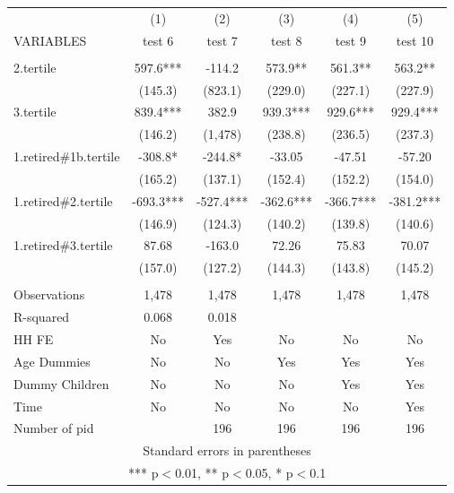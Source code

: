 \begin{tabular}{lccccc} \hline
 & (1) & (2) & (3) & (4) & (5) \\
VARIABLES & test 6 & test 7 & test 8 & test 9 & test 10 \\ \hline
 &  &  &  &  &  \\
2.tertile & 597.6*** & -114.2 & 573.9** & 561.3** & 563.2** \\
 & (145.3) & (823.1) & (229.0) & (227.1) & (227.9) \\
3.tertile & 839.4*** & 382.9 & 939.3*** & 929.6*** & 929.4*** \\
 & (146.2) & (1,478) & (238.8) & (236.5) & (237.3) \\
1.retired\#1b.tertile & -308.8* & -244.8* & -33.05 & -47.51 & -57.20 \\
 & (165.2) & (137.1) & (152.4) & (152.2) & (154.0) \\
1.retired\#2.tertile & -693.3*** & -527.4*** & -362.6*** & -366.7*** & -381.2*** \\
 & (146.9) & (124.3) & (140.2) & (139.8) & (140.6) \\
1.retired\#3.tertile & 87.68 & -163.0 & 72.26 & 75.83 & 70.07 \\
 & (157.0) & (127.2) & (144.3) & (143.8) & (145.2) \\
 &  &  &  &  &  \\
Observations & 1,478 & 1,478 & 1,478 & 1,478 & 1,478 \\
R-squared & 0.068 & 0.018 &  &  &  \\
HH FE & No & Yes & No & No & No \\
Age Dummies & No & No & Yes & Yes & Yes \\
Dummy Children & No & No & No & Yes & Yes \\
Time & No & No & No & No & Yes \\
 Number of pid &  & 196 & 196 & 196 & 196 \\ \hline
\multicolumn{6}{c}{ Standard errors in parentheses} \\
\multicolumn{6}{c}{ *** p$<$0.01, ** p$<$0.05, * p$<$0.1} \\
\end{tabular}
